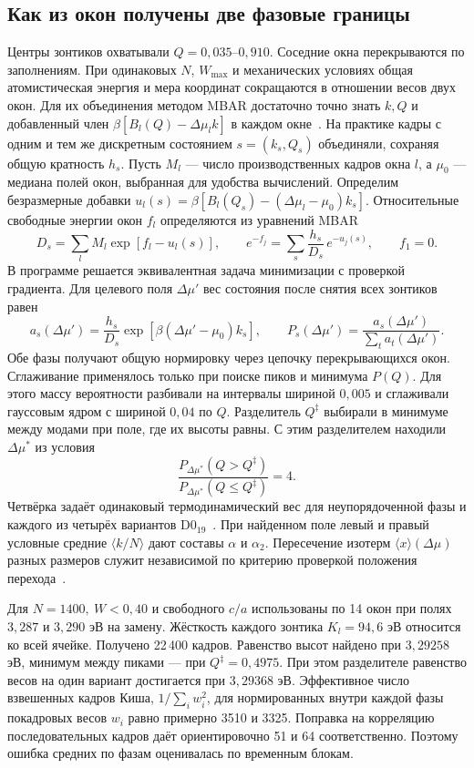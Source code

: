 \documentclass[11pt,a4paper]{article}
\begin{document}
\subsection{Как из окон получены две фазовые границы}
Центры зонтиков охватывали \(Q=0{,}035\)--\(0{,}910\).
Соседние окна перекрываются по заполнениям. При одинаковых \(N\),
\(W_{\max}\) и механических условиях общая атомистическая энергия и
мера координат сокращаются в отношении весов двух окон. Для их объединения
методом MBAR достаточно точно знать \(k,Q\) и добавленный член
\(\beta[B_l(Q)-\Delta\mu_l k]\) в каждом окне~\cite{mbar2008}.
На практике кадры с одним и тем же дискретным состоянием \(s=(k_s,Q_s)\)
объединяли, сохраняя общую кратность \(h_s\). Пусть \(M_l\) — число
производственных кадров окна \(l\), а \(\mu_0\) — медиана полей окон,
выбранная для удобства вычислений. Определим безразмерные добавки
\(u_l(s)=\beta[B_l(Q_s)-(\Delta\mu_l-\mu_0)k_s]\).
Относительные свободные энергии окон \(f_l\) определяются из уравнений MBAR
\begin{equation}
 D_s=\sum_l M_l\exp[f_l-u_l(s)],\qquad
 e^{-f_j}=\sum_s \frac{h_s}{D_s}\,e^{-u_j(s)},\qquad f_1=0 .
 \label{eq:umbrella-mbar}
\end{equation}
В программе решается эквивалентная задача минимизации с проверкой
градиента. Для целевого поля \(\Delta\mu'\) вес состояния после снятия
всех зонтиков равен
\[
 a_s(\Delta\mu')=\frac{h_s}{D_s}\exp[\beta(\Delta\mu'-\mu_0)k_s],
 \qquad P_s(\Delta\mu')=\frac{a_s(\Delta\mu')}{\sum_t a_t(\Delta\mu')}.
\]
Обе фазы получают общую нормировку через цепочку перекрывающихся окон.
Сглаживание применялось только при поиске пиков и минимума \(P(Q)\).
Для этого массу вероятности разбивали на интервалы шириной \(0{,}005\)
и сглаживали гауссовым ядром с шириной \(0{,}04\) по \(Q\).
Разделитель \(Q^\ddagger\) выбирали в минимуме между модами
при поле, где их высоты равны. С этим разделителем находили \(\Delta\mu^*\)
из условия
\[
 \frac{P_{\Delta\mu^*}(Q>Q^\ddagger)}
      {P_{\Delta\mu^*}(Q\le Q^\ddagger)}=4 .
\]
Четвёрка задаёт одинаковый термодинамический вес для неупорядоченной фазы
и каждого из четырёх вариантов D0$_{19}$~\cite{janke1993}.
При найденном поле левый и правый условные средние \(\langle k/N\rangle\)
дают составы \(\alpha\) и \(\alpha_2\). Пересечение изотерм
\(\langle x\rangle(\Delta\mu)\) разных размеров служит независимой по
критерию проверкой положения перехода~\cite{borgs1992}.

Для \(N=1400,\ W<0{,}40\) и свободного \(c/a\) использованы по 14 окон
при полях \(3{,}287\) и \(3{,}290\) эВ на замену. Жёсткость каждого
зонтика \(K_l=94{,}6\) эВ относится ко всей ячейке. Получено 22\,400
кадров. Равенство высот найдено при \(3{,}29258\) эВ, минимум между
пиками — при \(Q^\ddagger=0{,}4975\). При этом разделителе равенство
весов на один вариант достигается при \(3{,}29368\) эВ. Эффективное
число взвешенных кадров Киша, \(1/\sum_i w_i^2\), для нормированных
внутри каждой фазы покадровых весов \(w_i\) равно примерно 3510 и 3325.
Поправка на корреляцию последовательных кадров даёт ориентировочно
51 и 64 соответственно. Поэтому ошибка средних по фазам оценивалась
по временным блокам.
\end{document}
